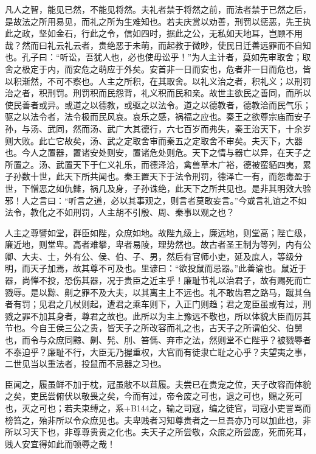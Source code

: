 \documentclass[12pt,UTF8]{ctexbook}
\begin{document}
凡人之智，能见已然，不能见将然。夫礼者禁于将然之前，而法者禁于已然之后，是故法之所用易见，而礼之所为生难知也。若夫庆赏以劝善，刑罚以惩恶，先王执此之政，坚如金石，行此之令，信如四时，据此之公，无私如天地耳，岂顾不用哉？然而曰礼云礼云者，贵绝恶于未萌，而起教于微眇，使民日迁善远罪而不自知也。孔子曰：“听讼，吾犹人也，必也使毋讼乎！”为人主计者，莫如先审取舍；取舍之极定于内，而安危之萌应于外矣。安首非一日而安也，危者非一日而危也，皆以积渐然，不可不察也。人主之所积，在其取舍。以礼义治之者，积礼义；以刑罚治之者，积刑罚。刑罚积而民怨背，礼义积而民和亲。故世主欲民之善同，而所以使民善者或异。或道之以德教，或驱之以法令。道之以德教者，德教洽而民气乐；驱之以法令者，法令极而民风哀。哀乐之感，祸福之应也。秦王之欲尊宗庙而安子孙，与汤、武同，然而汤、武广大其德行，六七百岁而弗失，秦王治天下，十余岁则大败。此亡它故矣，汤、武之定取舍审而秦五之定取舍不审矣。夫天下，大器也。今人之置器，置诸安处则安，置诸危处则危。天下之情与器亡以异，在天子之所置之。汤、武置天下于仁义礼乐，而德泽洽，禽兽草木广裕，德被蛮貊四夷，累子孙数十世，此天下所共闻也。秦王置天下于法令刑罚，德泽亡一有，而怨毒盈于世，下憎恶之如仇雠，祸几及身，子孙诛绝，此天下之所共见也。是非其明效大验邪！人之言曰：“听言之道，必以其事观之，则言者莫敢妄言。”今或言礼谊之不如法令，教化之不如刑罚，人主胡不引殷、周、秦事以观之也？



人主之尊譬如堂，群臣如陛，众庶如地。故陛九级上，廉远地，则堂高；陛亡级，廉近地，则堂卑。高者难攀，卑者易陵，理势然也。故古者圣王制为等列，内有公卿、大夫、士，外有公、侯、伯、子、男，然后有官师小吏，延及庶人，等级分明，而天子加焉，故其尊不可及也。里谚曰：“欲投鼠而忌器。”此善谕也。鼠近于器，尚惮不投，恐伤其器，况于贵臣之近主乎！廉耻节礼以治君子，故有赐死而亡戮辱。是以黥、劓之罪不及大夫，以其离主上不远也。礼不敢齿君之路马，蹴其刍者有罚；见君之几杖则起，遭君之乘车则下，入正门则趋；君之宠臣虽或有过，刑戮之罪不加其身者，尊君之故也。此所以为主上豫远不敬也，所以体貌大臣而厉其节也。今自王侯三公之贵，皆天子之所改容而礼之也，古天子之所谓伯父、伯舅也，而令与众庶同黥、劓、髡、刖、笞傌、弃市之法，然则堂不亡陛乎？被戮辱者不泰迫乎？廉耻不行，大臣无乃握重权，大官而有徒隶亡耻之心乎？夫望夷之事，二世见当以重法者，投鼠而不忌器之习也。



臣闻之，履虽鲜不加于枕，冠虽敝不以苴履。夫尝已在贵宠之位，天子改容而体貌之矣，吏民尝俯伏以敬畏之矣，今而有过，帝令废之可也，退之可也，赐之死可也，灭之可也；若夫束缚之，系+B144之，输之司寇，编之徒官，司寇小吏詈骂而榜笞之，殆非所以令众庶见也。夫卑贱者习知尊贵者之一旦吾亦乃可以加此也，非所以习天下也，非尊尊贵贵之化也。夫天子之所尝敬，众庶之所尝庞，死而死耳，贱人安宜得如此而顿辱之哉！
\end{document}
